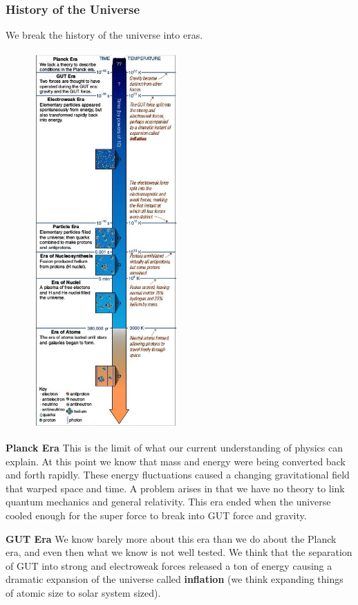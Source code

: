 \subsubsection{History of the Universe}
We break the history of the universe into eras.

\begin{figure}
\includegraphics[width=5.5cm]{eras}
\end{figure}

\textbf{Planck Era}
This is the limit of what our current understanding of physics can explain. At this point we know that mass and energy were being converted back and forth rapidly. These energy fluctuations caused a changing gravitational field that warped space and time. A problem arises in that we have no theory to link quantum mechanics and general relativity. This era ended when the universe cooled enough for the super force to break into GUT force and gravity.

\textbf{GUT Era}
We know barely more about this era than we do about the Planck era, and even then what we know is not well tested. We think that the separation of GUT into strong and electroweak forces released a ton of energy causing a dramatic expansion of the universe called \textbf{inflation} (we think expanding things of atomic size to solar system sized).

